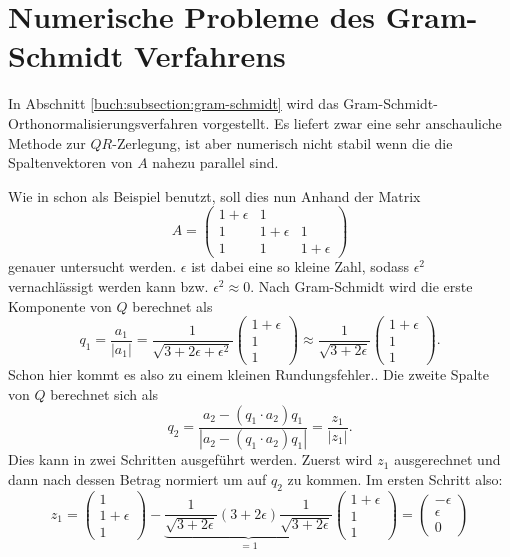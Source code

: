 %
%
%
\section{Numerische Probleme des Gram-Schmidt Verfahrens
\label{qr:section:problemstellung}}
In Abschnitt \ref{buch:subsection:gram-schmidt} wird das Gram-Schmidt-Orthonormalisierungsverfahren vorgestellt.
Es liefert zwar eine sehr anschauliche Methode zur $QR$-Zerlegung, ist aber numerisch nicht stabil wenn die die Spaltenvektoren von $A$ nahezu parallel sind.

Wie in \cite{qr:tam} schon als Beispiel benutzt, soll dies nun Anhand der Matrix
\begin{equation*}
A=\begin{pmatrix}
1+\epsilon&1&\\
1&1+\epsilon&1\\
1&1&1+\epsilon
\end{pmatrix}
\end{equation*}
genauer untersucht werden.
$\epsilon$ ist dabei eine so \glqq kleine\grqq{} Zahl, sodass $\epsilon^2$ vernachlässigt werden kann bzw. $\epsilon^2\approx0$.
Nach Gram-Schmidt wird die erste Komponente von $Q$ berechnet als
\begin{equation*}
q_1=\frac{a_1}{|a_1|}=\frac{1}{\sqrt{3+2\epsilon+\epsilon^2}}
\begin{pmatrix}
1+\epsilon\\
1\\
1
\end{pmatrix}\approx\frac{1}{\sqrt{3+2\epsilon}}
\begin{pmatrix}
1+\epsilon\\
1\\
1
\end{pmatrix}.
\end{equation*}
Schon hier kommt es also zu einem kleinen Rundungsfehler..
Die zweite Spalte von $Q$ berechnet sich als
\begin{equation*}
q_2=\frac{a_2-(q_1\cdot a_2)q_1}{|a_2-(q_1\cdot a_2)q_1|}=\frac{z_1}{|z_1|}.
\end{equation*} 
Dies kann in zwei Schritten ausgeführt werden. Zuerst wird $z_1$ ausgerechnet und dann nach dessen Betrag normiert um auf $q_2$ zu kommen.
Im ersten Schritt also:
\begin{equation*}
z_1=
\begin{pmatrix}
1\\
1+\epsilon\\
1
\end{pmatrix}-\underbrace{\frac{1}{\sqrt{3+2\epsilon}}(3+2\epsilon)\frac{1}{\sqrt{3+2\epsilon}}}_{=1}
\begin{pmatrix}
1+\epsilon\\
1\\
1
\end{pmatrix}=
\begin{pmatrix}
-\epsilon\\
\epsilon\\
0
\end{pmatrix}
\end{equation*}
